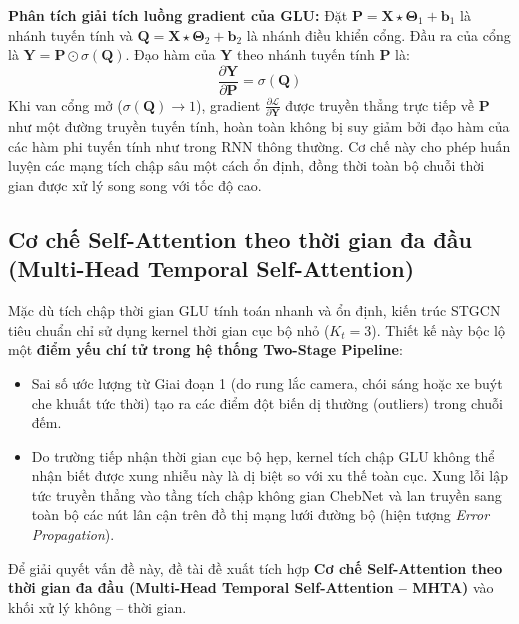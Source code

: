 \textbf{Phân tích giải tích luồng gradient của GLU:}
Đặt $\mathbf{P} = \mathbf{X} \star \boldsymbol{\Theta}_1 + \mathbf{b}_1$ là nhánh tuyến tính và $\mathbf{Q} = \mathbf{X} \star \boldsymbol{\Theta}_2 + \mathbf{b}_2$ là nhánh điều khiển cổng. Đầu ra của cổng là $\mathbf{Y} = \mathbf{P} \odot \sigma(\mathbf{Q})$. Đạo hàm của $\mathbf{Y}$ theo nhánh tuyến tính $\mathbf{P}$ là:
\begin{equation}
    \frac{\partial \mathbf{Y}}{\partial \mathbf{P}} = \sigma(\mathbf{Q})
\end{equation}
Khi van cổng mở ($\sigma(\mathbf{Q}) \to 1$), gradient $\frac{\partial \mathcal{L}}{\partial \mathbf{Y}}$ được truyền thẳng trực tiếp về $\mathbf{P}$ như một đường truyền tuyến tính, hoàn toàn không bị suy giảm bởi đạo hàm của các hàm phi tuyến tính như trong RNN thông thường. Cơ chế này cho phép huấn luyện các mạng tích chập sâu một cách ổn định, đồng thời toàn bộ chuỗi thời gian được xử lý song song với tốc độ cao.

\subsection{Cơ chế Self-Attention theo thời gian đa đầu (Multi-Head Temporal Self-Attention)}

Mặc dù tích chập thời gian GLU tính toán nhanh và ổn định, kiến trúc STGCN tiêu chuẩn chỉ sử dụng kernel thời gian cục bộ nhỏ ($K_t = 3$). Thiết kế này bộc lộ một \textbf{điểm yếu chí tử trong hệ thống Two-Stage Pipeline}:
\begin{itemize}
    \item Sai số ước lượng từ Giai đoạn 1 (do rung lắc camera, chói sáng hoặc xe buýt che khuất tức thời) tạo ra các điểm đột biến dị thường (outliers) trong chuỗi đếm.
    \item Do trường tiếp nhận thời gian cục bộ hẹp, kernel tích chập GLU không thể nhận biết được xung nhiễu này là dị biệt so với xu thế toàn cục. Xung lỗi lập tức truyền thẳng vào tầng tích chập không gian ChebNet và lan truyền sang toàn bộ các nút lân cận trên đồ thị mạng lưới đường bộ (hiện tượng \textit{Error Propagation}).
\end{itemize}

Để giải quyết vấn đề này, đề tài đề xuất tích hợp \textbf{Cơ chế Self-Attention theo thời gian đa đầu (Multi-Head Temporal Self-Attention -- MHTA)} vào khối xử lý không -- thời gian.


